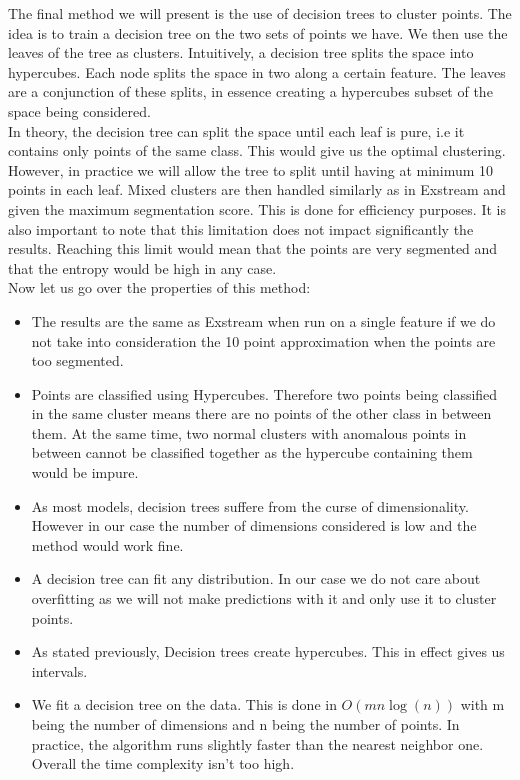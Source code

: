 \documentclass[oneside, a4paper, onecolumn, 11pt]{article}
\begin{document}
The final method we will present is the use of decision trees to cluster points. The idea is to train a decision tree on the two sets of points we have. We then use the leaves of the tree as clusters. Intuitively, a decision tree splits the space into hypercubes. Each node splits the space in two along a certain feature. The leaves are a conjunction of these splits, in essence creating a hypercubes subset of the space being considered. \\
In theory, the decision tree can split the space until each leaf is pure, i.e it contains only points of the same class. This would give us the optimal clustering. However, in practice we will allow the tree to split until having at minimum 10 points in each leaf. Mixed clusters are then handled similarly as in Exstream and given the maximum segmentation score. This is done for efficiency purposes. It is also important to note that this limitation does not impact significantly the results. Reaching this limit would mean that the points are very segmented and that the entropy would be high in any case.\\
Now let us go over the properties of this method: 
\begin{itemize}
  \item The results are the same as Exstream when run on a single feature if we do not take into consideration the 10 point approximation when the points are too segmented.
  \item Points are classified using Hypercubes. Therefore two points being classified in the same cluster means there are no points of the other class in between them. At the same time, two normal clusters with anomalous points in between cannot be classified together as the hypercube containing them would be impure.
  \item As most models, decision trees suffere from the curse of dimensionality. However in our case the number of dimensions considered is low and the method would work fine.
  \item A decision tree can fit any distribution. In our case we do not care about overfitting as we will not make predictions with it and only use it to cluster points.
  \item As stated previously, Decision trees create hypercubes. This in effect gives us intervals.
  \item We fit a decision tree on the data. This is done in $O(m n \log(n))$ with m being the number of dimensions and n being the number of points. In practice, the algorithm runs slightly faster than the nearest neighbor one. Overall the time complexity isn't too high.
\end{itemize}
\end{document}
